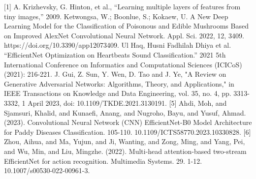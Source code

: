 [1] A. Krizhevsky, G. Hinton, et al., “Learning multiple layers of features
from tiny images,” 2009.
\hfill \break
[2] Ketwongsa, W.; Boonlue, S.; Kokaew, U. A New Deep Learning Model for the Classification of Poisonous and Edible Mushrooms Based on Improved AlexNet Convolutional Neural Network. Appl. Sci. 2022, 12, 3409. https://doi.org/10.3390/app12073409.
\hfill \break
[3]  Ul Haq, Husni Fadhilah Dhiya et al. “EfficientNet Optimization on Heartbeats Sound Classification.” 2021 5th International Conference on Informatics and Computational Sciences (ICICoS) (2021): 216-221.
\hfill \break
[4] J. Gui, Z. Sun, Y. Wen, D. Tao and J. Ye, "A Review on Generative Adversarial Networks: Algorithms, Theory, and Applications," in IEEE Transactions on Knowledge and Data Engineering, vol. 35, no. 4, pp. 3313-3332, 1 April 2023, doi: 10.1109/TKDE.2021.3130191.
[5] Ahdi, Moh, and Sjamsuri, Khalid, and Kunaefi, Anang, and  Nugroho, Bayu, and Yusuf, Ahmad. (2023). Convolutional Neural Network (CNN) EfficientNet-B0 Model Architecture for Paddy Diseases Classification. 105-110. 10.1109/ICTS58770.2023.10330828. 
[6] Zhou, Aihua, and Ma, Yujun, and Ji, Wanting, and Zong, Ming, and Yang, Pei, and Wu, Min, and Liu, Mingzhe. (2022). Multi-head attention-based two-stream EfficientNet for action recognition. Multimedia Systems. 29. 1-12. 10.1007/s00530-022-00961-3. 